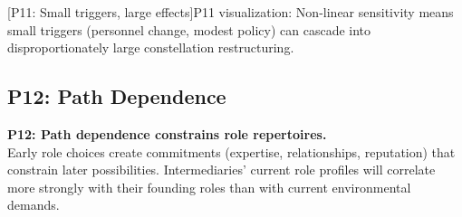 \documentclass[../main.tex]{subfiles}
\begin{document}
\begin{center}
[P11: Small triggers, large effects]{P11 visualization: Non-linear sensitivity means small triggers (personnel change, modest policy) can cascade into disproportionately large constellation restructuring.}
\end{center}

\vspace{0.5cm}
\subsection{P12: Path Dependence}

\begin{propositionbox}
\textbf{P12: Path dependence constrains role repertoires.}\\[3pt]
Early role choices create commitments (expertise, relationships, reputation) that constrain later possibilities. Intermediaries' current role profiles will correlate more strongly with their founding roles than with current environmental demands.
\end{propositionbox}
\end{document}
